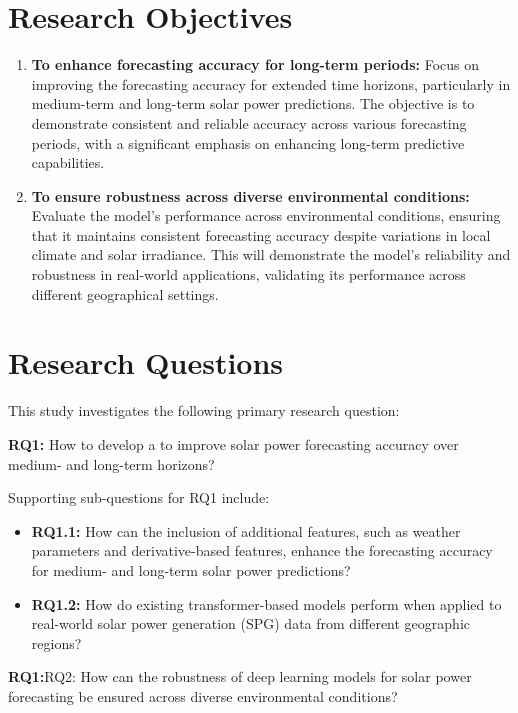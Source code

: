 \documentclass[12pt]{uomthesis}
\begin{document}
\section{Research Objectives}
\label{ch:research:objectives}
\begin{enumerate}
    \item \textbf{To enhance forecasting accuracy for long-term periods:} Focus on improving the forecasting accuracy for extended time horizons, particularly in medium-term and long-term solar power predictions. The objective is to demonstrate consistent and reliable accuracy across various forecasting periods, with a significant emphasis on enhancing long-term predictive capabilities.
    
    \item \textbf{To ensure robustness across diverse environmental conditions:} Evaluate the model’s performance across environmental conditions, ensuring that it maintains consistent forecasting accuracy despite variations in local climate and solar irradiance. This will demonstrate the model’s reliability and robustness in real-world applications, validating its performance across different geographical settings.
\end{enumerate}



\section{Research Questions}
\label{sec:research-questions}

This study investigates the following primary research question:

\noindent\textbf{RQ1:} How to develop a  to improve solar power forecasting accuracy over medium- and long-term horizons?

Supporting sub-questions for RQ1 include:

\begin{itemize}
    \item \textbf{RQ1.1:} How can the inclusion of additional features, such as weather parameters and derivative-based features, enhance the forecasting accuracy for medium- and long-term solar power predictions?
    \item \textbf{RQ1.2:} How do existing transformer-based models perform when applied to real-world solar power generation (SPG) data from different geographic regions?
\end{itemize}


\noindent\textbf{RQ1:}{RQ2:} How can the robustness of deep learning models for solar power forecasting be ensured across diverse environmental conditions?
\end{document}
